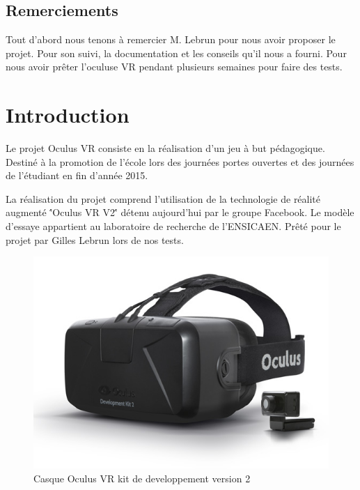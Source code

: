 \documentclass[a4paper,11pt]{myreport}
\begin{document}
\setlength{\textheight}{26cm}
\setlength{\topmargin}{-2cm}

\tableofcontents


\newpage
\section*{Remerciements}
\par Tout d'abord nous tenons à remercier M. Lebrun pour nous avoir proposer le projet. Pour son suivi, la documentation et les conseils qu'il nous a fourni.
Pour nous avoir prêter l'oculuse VR pendant plusieurs semaines pour faire des tests.


\chapter{Introduction}
\par Le projet Oculus VR consiste en la réalisation d'un jeu à but pédagogique. Destiné à la promotion de l'école lors des journées portes ouvertes et des journées de l'étudiant en fin d'année 2015.
\par La réalisation du projet comprend l'utilisation de la technologie de réalité augmenté \''Oculus VR V2\'' détenu aujourd'hui par le groupe Facebook. Le modèle d'essaye appartient au laboratoire de recherche de l'ENSICAEN. Prêté pour le projet par Gilles Lebrun lors de nos tests.
\begin{figure}[h] 
	\includegraphics[scale=0.70]{./images/dk2-product.jpg}
	\caption{Casque Oculus VR kit de developpement version 2}
\end{figure}
\end{document}
